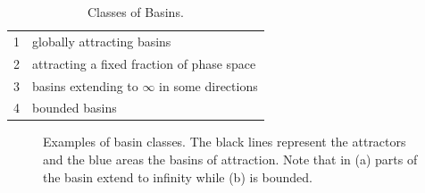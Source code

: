 \begin{table}[ht]
\caption[Classes of Basins]{Classes of Basins. \cite{classify}}
\begin{tabular}{l l}
\hline
1       &  globally attracting basins\\
2       &  attracting a fixed fraction of phase space\\
3       & basins extending to $\infty$ in some directions\\
4       & bounded basins\\                
\hline
\end{tabular}
\label{t:class}
\end{table}
\begin{figure}
    \centering
    \qquad
    \caption[Examples of Basin Classes]{Examples of basin classes. The black lines represent the attractors and the blue areas the basins of attraction. Note that in (a) parts of the basin extend to infinity while (b) is bounded. \cite{classify}}%
    \label{fig:classes}%
\end{figure}

